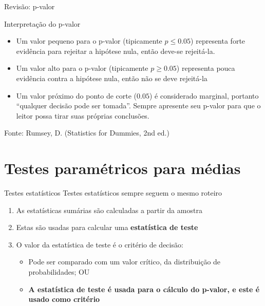 \documentclass{beamer}
\begin{document}
\begin{frame}{Revisão: p-valor}
\begin{block}{Interpretação do p-valor}
  \begin{itemize}
    \small
  \item Um valor pequeno para o p-valor (tipicamente $p \le 0.05$)
    representa forte evidência para rejeitar a hipótese nula, então
    deve-se rejeitá-la.
  \item Um valor alto para o p-valor (tipicamente $p \ge 0.05$)
    representa pouca evidência contra a hipótese nula, então não se
    deve rejeitá-la
  \item Um valor próximo do ponto de corte ($0.05$) é considerado
    marginal, portanto ``qualquer decisão pode ser tomada''. Sempre
    apresente seu p-valor para que o leitor possa tirar suas próprias
    conclusões.
  \end{itemize}
\end{block}
Fonte: Rumsey, D. (Statistics for Dummies, 2nd ed.)
\end{frame}

\section{Testes paramétricos para médias}

\begin{frame}{Testes estatísticos}
Testes estatísticos sempre seguem o mesmo roteiro
  \begin{enumerate}
  \item As estatísticas sumárias são calculadas a partir da amostra
  \item Estas são usadas para calcular uma {\bf estatística de teste}
  \item O valor da estatística de teste é o critério de decisão:
    \begin{itemize}
    \item Pode ser comparado com um valor crítico, da distribuição de probabilidades; OU
    \item {\bf A estatística de teste é usada para o cálculo do p-valor, e este é usado como critério}
    \end{itemize}
  \end{enumerate}
\end{frame}
\end{document}
